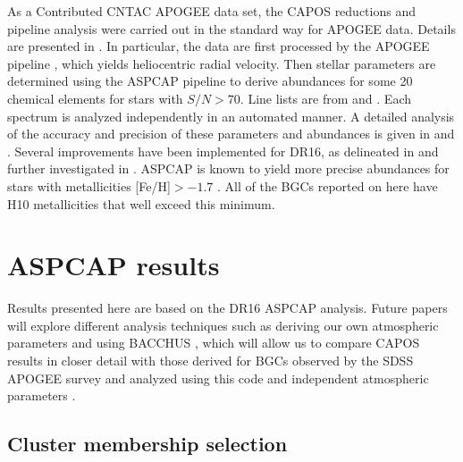 \documentclass[onecolumn]{aa}
\begin{document}
As a Contributed CNTAC APOGEE data set, the CAPOS reductions and pipeline analysis were carried out in the standard way for APOGEE data. Details are presented in \citet{DR16}. In particular, the data are first processed by the APOGEE pipeline \citep{Nidever2015}, which yields heliocentric radial velocity. Then 
stellar parameters are determined using the ASPCAP pipeline \citep{GarciaPerez2018} to derive abundances for some 20 chemical elements for stars with $S/N>70$. 
Line lists are from 
\citet{Shetrone2015} and \citet{Smith2021}.
Each spectrum is analyzed independently in an automated manner.
A detailed analysis of the accuracy and precision of these parameters and abundances is given in \citet{Holtzman2018} and \citet{Henrik2018}. Several improvements have been implemented for DR16, as delineated in \citet{DR16} and further investigated in \citet{Henrik2020}. 
ASPCAP is known to yield more precise abundances for stars with metallicities [Fe/H]$>-1.7$ \citep{Leung2019}. 
All of the BGCs reported on here have H10 metallicities that well exceed this minimum. 

\section{ASPCAP results}

Results
presented here are based on the DR16 ASPCAP analysis. Future papers will explore different analysis techniques such as deriving our own atmospheric parameters and using BACCHUS \citep[Brussels Automatic Code for Characterizing High accUracy Spectra -][]{Masseron2016}, which will allow us to compare  CAPOS results in closer detail with those derived for BGCs observed by the SDSS APOGEE survey and analyzed using this code and independent atmospheric parameters \citep{Masseron2019, Meszaros2020}.  

\subsection{Cluster membership selection}
\end{document}
